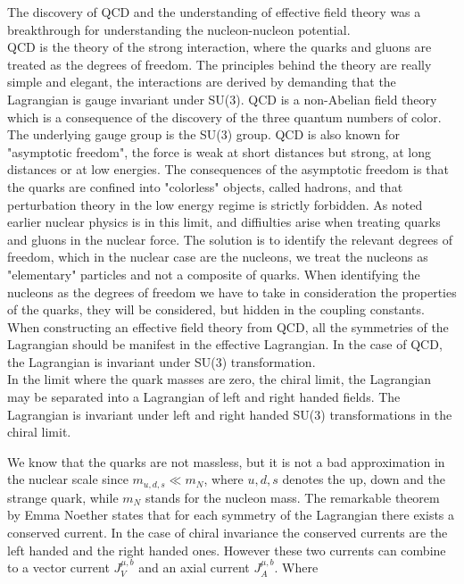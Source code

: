 The discovery of QCD and the understanding of effective field theory was a breakthrough for understanding the nucleon-nucleon potential.\\
 QCD is the 
theory of the strong interaction, where the quarks and gluons are treated as the degrees of freedom. 
The principles behind the theory are really simple and 
elegant, the interactions are derived by demanding that the Lagrangian is gauge invariant under SU(3). 
QCD is a non-Abelian field theory which is a consequence of 
the discovery of the three quantum numbers of color. The underlying gauge group is the SU(3) group. QCD is also known for "asymptotic freedom", the force
is weak at short distances but strong, at long distances or at low energies. The consequences of the asymptotic freedom is that the quarks are confined 
into "colorless" objects, called hadrons, and that perturbation theory in the low energy regime is strictly forbidden. As noted earlier nuclear physics 
is in this limit, and diffiulties arise when treating quarks and gluons in the nuclear force. 
The solution is to identify the relevant degrees of freedom, which in the nuclear case are the nucleons, we treat the nucleons as "elementary" particles 
and not a composite of quarks. When identifying the nucleons as the degrees of freedom we have to take in consideration the properties of the quarks,
they will be considered, but hidden in the coupling constants.\\

When constructing an effective field theory from QCD, all the symmetries 
of the Lagrangian should be manifest in the effective Lagrangian. In the case
of QCD, the Lagrangian is invariant under SU(3) transformation. \\
In the limit where the quark masses are zero, the chiral limit, the 
Lagrangian may be separated into a Lagrangian of left and right handed 
fields. The Lagrangian is invariant under left and right handed SU(3) 
transformations in the chiral limit.

We know that the quarks are not massless, but it is not a bad approximation
in the nuclear scale since $m_{u,d,s} \ll m_N$, where $u,d,s$ denotes the 
up, down and the strange quark, while $m_N$ stands for the nucleon mass. 
The remarkable theorem by Emma Noether states that for each symmetry of
the Lagrangian there exists a conserved current. In the case of chiral 
invariance the conserved currents are the left handed and the right handed 
ones. However these two currents can combine to a vector current 
$J^{\mu,b}_V$  and an axial current $J^{\mu , b}_A$. Where 

